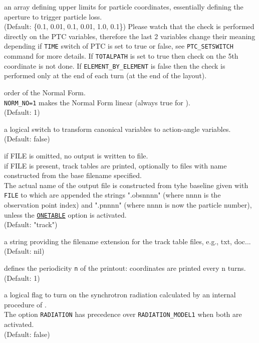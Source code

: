 \begin{madlist}
    an array defining upper limits for particle
   coordinates, essentially defining the aperture to trigger particle
   loss. \\ (Default: \{0.1, 0.01, 0.1, 0.01, 1.0, 0.1\})
   Please watch that the check is performed directly on the PTC variables, 
   therefore the last 2 variables change their meaning depending if 
   \texttt{TIME} switch of PTC is set to true or false, see 
   \texttt{PTC\_SETSWITCH} command for more details.
   If \texttt{TOTALPATH} is set to true then check on the 5th coordinate
   is not done.
   If \texttt{ELEMENT\_BY\_ELEMENT} is false then the check is performed
   only at the end of each turn (at the end of the layout). 
   

    order of the Normal Form.\\
   \texttt{NORM\_NO=1} makes the Normal Form linear (always true for
   \madx). \\ (Default: 1)

    a logical switch to transform canonical variables
   to action-angle variables. \\ (Default: false) 

    if FILE is omitted, no output is written to file.\\
   if FILE is present, track tables are printed, optionally to 
   files with name constructed from the base filename specified. \\
   The actual name of the output file is constructed from
   tyhe baseline given with \texttt{FILE} to which are appended the
   strings ".obsnnnn" (where nnnn is the observation point index) and
   ".pnnnn" (where nnnn is now the particle number), unless the
   \hyperref[opt:onetable]{\texttt{ONETABLE}} option is activated.  \\
   (Default: "track") 

    a string providing the filename extension for the
   track table files, e.g., txt, doc...  \\ (Default: nil)

    defines the periodicity \texttt{n} of the printout:
   coordinates are printed every n turns. \\ (Default: 1)

   \label{opt:radiation} a logical flag to turn on
     the synchrotron radiation calculated by an internal procedure of
     \ptc. \\
     The option \texttt{RADIATION} has precedence over \texttt{RADIATION\_MODEL1}
     when both are activated. 
     \\ (Default: false)


\end{madlist}

